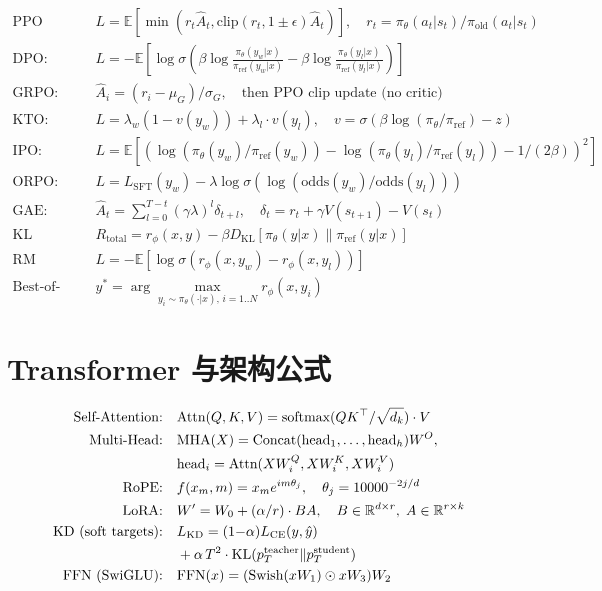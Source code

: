 \begin{align}
\text{PPO Clip:}&\quad L = \mathbb{E}[\min(r_t\hat{A}_t, \text{clip}(r_t,1{\pm}\epsilon)\hat{A}_t)], \quad r_t = \pi_\theta(a_t|s_t)/\pi_{\text{old}}(a_t|s_t) \\
\text{DPO:}&\quad L = -\mathbb{E}[\log\sigma(\beta\log\tfrac{\pi_\theta(y_w|x)}{\pi_\text{ref}(y_w|x)} - \beta\log\tfrac{\pi_\theta(y_l|x)}{\pi_\text{ref}(y_l|x)})] \\
\text{GRPO:}&\quad \hat{A}_i = (r_i - \mu_G)/\sigma_G, \quad \text{then PPO clip update (no critic)} \\
\text{KTO:}&\quad L = \lambda_w(1 - v(y_w)) + \lambda_l \cdot v(y_l), \quad v = \sigma(\beta\log(\pi_\theta/\pi_\text{ref}) - z) \\
\text{IPO:}&\quad L = \mathbb{E}[(\log(\pi_\theta(y_w)/\pi_\text{ref}(y_w)) - \log(\pi_\theta(y_l)/\pi_\text{ref}(y_l)) - 1/(2\beta))^2] \\
\text{ORPO:}&\quad L = L_\text{SFT}(y_w) - \lambda\log\sigma(\log(\text{odds}(y_w)/\text{odds}(y_l))) \\
\text{GAE:}&\quad \hat{A}_t = \textstyle\sum_{l=0}^{T-t}(\gamma\lambda)^l\delta_{t+l}, \quad \delta_t = r_t + \gamma V(s_{t+1}) - V(s_t) \\
\text{KL Penalty:}&\quad R_\text{total} = r_\phi(x,y) - \beta D_\text{KL}[\pi_\theta(y|x)\|\pi_\text{ref}(y|x)] \\
\text{RM (Bradley-Terry):}&\quad L = -\mathbb{E}[\log\sigma(r_\phi(x,y_w)-r_\phi(x,y_l))] \\
\text{Best-of-N:}&\quad y^* = \arg\max_{y_i \sim \pi_\theta(\cdot|x),\, i=1..N} r_\phi(x, y_i)
\end{align}

\section{Transformer 与架构公式}
\label{transformer-architecture-formulas}

{\small
\begin{align}
\text{Self-Attention:}&\quad \text{Attn}(Q,K,V) = \text{softmax}(QK^\top / \sqrt{d_k}) \cdot V \\
\text{Multi-Head:}&\quad \text{MHA}(X) = \text{Concat}(\text{head}_1, \ldots, \text{head}_h)W^O, \notag\\
&\quad \text{head}_i = \text{Attn}(XW_i^Q, XW_i^K, XW_i^V) \\
\text{RoPE:}&\quad f(x_m, m) = x_m e^{im\theta_j}, \quad \theta_j = 10000^{-2j/d} \\
\text{LoRA:}&\quad W' = W_0 + (\alpha/r) \cdot BA, \quad B \in \mathbb{R}^{d \times r},\; A \in \mathbb{R}^{r \times k} \\
\text{KD (soft targets):}&\quad L_\text{KD} = (1{-}\alpha)L_\text{CE}(y, \hat{y}) \notag\\
&\quad + \alpha\, T^2 \cdot \text{KL}(p_T^\text{teacher} \| p_T^\text{student}) \\
\text{FFN (SwiGLU):}&\quad \text{FFN}(x) = (\text{Swish}(xW_1) \odot xW_3) W_2
\end{align}
}

